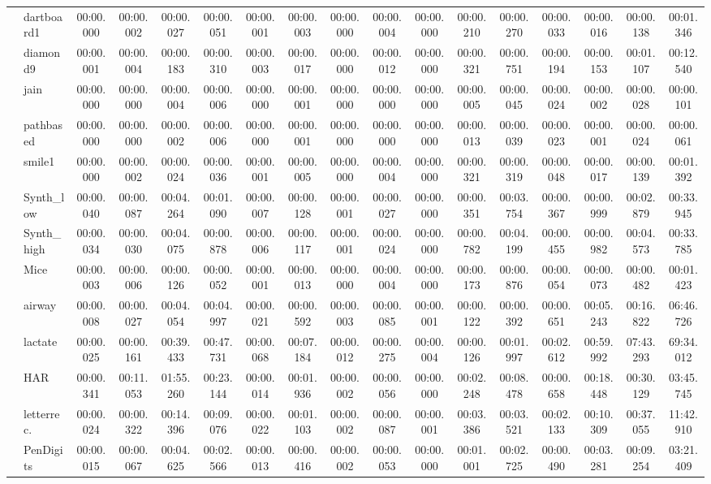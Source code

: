 {\begin{NiceTabular}{|rl|ccccccccc|cccccc|}
& dartboard1 & 00:00.000 & 00:00.002 & 00:00.027 & 00:00.051 & 00:00.001 & 00:00.003 & 00:00.000 & 00:00.004 & 00:00.000 & 00:00.210 & 00:00.270 & 00:00.033 & 00:00.016 & 00:00.138 & 00:01.346 \\
& diamond9 & 00:00.001 & 00:00.004 & 00:00.183 & 00:00.310 & 00:00.003 & 00:00.017 & 00:00.000 & 00:00.012 & 00:00.000 & 00:00.321 & 00:00.751 & 00:00.194 & 00:00.153 & 00:01.107 & 00:12.540 \\
& jain & 00:00.000 & 00:00.000 & 00:00.004 & 00:00.006 & 00:00.000 & 00:00.001 & 00:00.000 & 00:00.000 & 00:00.000 & 00:00.005 & 00:00.045 & 00:00.024 & 00:00.002 & 00:00.028 & 00:00.101 \\
& pathbased & 00:00.000 & 00:00.000 & 00:00.002 & 00:00.006 & 00:00.000 & 00:00.001 & 00:00.000 & 00:00.000 & 00:00.000 & 00:00.013 & 00:00.039 & 00:00.023 & 00:00.001 & 00:00.024 & 00:00.061 \\
& smile1 & 00:00.000 & 00:00.002 & 00:00.024 & 00:00.036 & 00:00.001 & 00:00.005 & 00:00.000 & 00:00.004 & 00:00.000 & 00:00.321 & 00:00.319 & 00:00.048 & 00:00.017 & 00:00.139 & 00:01.392 \\

\midrule
\parbox[t]{2mm}{}

& Synth\_low & 00:00.040 & 00:00.087 & 00:04.264 & 00:01.090 & 00:00.007 & 00:00.128 & 00:00.001 & 00:00.027 & 00:00.000 & 00:00.351 & 00:03.754 & 00:00.367 & 00:00.999 & 00:02.879 & 00:33.945 \\
& Synth\_high & 00:00.034 & 00:00.030 & 00:04.075 & 00:00.878 & 00:00.006 & 00:00.117 & 00:00.001 & 00:00.024 & 00:00.000 & 00:00.782 & 00:04.199 & 00:00.455 & 00:00.982 & 00:04.573 & 00:33.785 \\
& Mice & 00:00.003 & 00:00.006 & 00:00.126 & 00:00.052 & 00:00.001 & 00:00.013 & 00:00.000 & 00:00.004 & 00:00.000 & 00:00.173 & 00:00.876 & 00:00.054 & 00:00.073 & 00:00.482 & 00:01.423 \\
& airway & 00:00.008 & 00:00.027 & 00:04.054 & 00:04.997 & 00:00.021 & 00:00.592 & 00:00.003 & 00:00.085 & 00:00.001 & 00:00.122 & 00:00.392 & 00:00.651 & 00:05.243 & 00:16.822 & 06:46.726 \\
& lactate & 00:00.025 & 00:00.161 & 00:39.433 & 00:47.731 & 00:00.068 & 00:07.184 & 00:00.012 & 00:00.275 & 00:00.004 & 00:00.126 & 00:01.997 & 00:02.612 & 00:59.992 & 07:43.293 & 69:34.012 \\
& HAR & 00:00.341 & 00:11.053 & 01:55.260 & 00:23.144 & 00:00.014 & 00:01.936 & 00:00.002 & 00:00.056 & 00:00.000 & 00:02.248 & 00:08.478 & 00:00.658 & 00:18.448 & 00:30.129 & 03:45.745 \\
& letterrec. & 00:00.024 & 00:00.322 & 00:14.396 & 00:09.076 & 00:00.022 & 00:01.103 & 00:00.002 & 00:00.087 & 00:00.001 & 00:03.386 & 00:03.521 & 00:02.133 & 00:10.309 & 00:37.055 & 11:42.910 \\
& PenDigits & 00:00.015 & 00:00.067 & 00:04.625 & 00:02.566 & 00:00.013 & 00:00.416 & 00:00.002 & 00:00.053 & 00:00.000 & 00:01.001 & 00:02.725 & 00:00.490 & 00:03.281 & 00:09.254 & 03:21.409 \\


\end{NiceTabular}}

